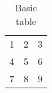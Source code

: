 \documentclass{article}
\begin{document}
\begin{table}
	\centering
	\begin{tabular}{c c c }
		1 & 2 & 3 \\
		4 & 5 & 6 \\
		7 & 8 & 9 \\
	\end{tabular}
	\caption{Basic table}
\end{table}
\end{document}
